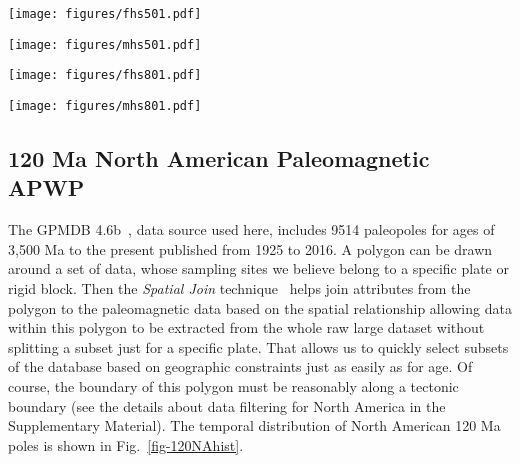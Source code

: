 \begin{figure*}
\centering
\texttt{[image: figures/fhs501.pdf]}
\caption[120 Ma FHM predicted APWP of India]{FHM predicted
120 Ma APWP for India through the
India\textendash{}Somalia\textendash{}Nubia\textendash{}Mantle plate circuit.
Its age step is 5 Myr.}\label{fig-fhsPred501}
\end{figure*}

\begin{figure*}
\centering
\texttt{[image: figures/mhs501.pdf]}
\caption[120 Ma MHM predicted APWP of India]{MHM predicted
120 Ma APWP for India through the
India\textendash{}Somalia\textendash{}Nubia\textendash{}Mantle plate circuit.
Its age step is 5 Myr. The dashed line is the FHM predicted path shown in
Fig.~\ref{fig-fhsPred501}.}\label{fig-mhsPred501}
\end{figure*}

\begin{figure*}
\centering
\texttt{[image: figures/fhs801.pdf]}
\caption[120 Ma FHM predicted APWP of Australia]{FHM predicted
120 Ma APWP for Australia through the Australia\textendash{}East
Antarctica\textendash{}Somalia\textendash{}Nubia\textendash{}Mantle plate
circuit. Its age step is 5 Myr.}\label{fig-fhsPred801}
\end{figure*}

\begin{figure*}
\centering
\texttt{[image: figures/mhs801.pdf]}
\caption[120 Ma MHM predicted APWP of Australia]{MHM predicted
120 Ma APWP for Australia through the Australia\textendash{}East
Antarctica\textendash{}Somalia\textendash{}Nubia\textendash{}Mantle plate
circuit. Its age step is 5 Myr. The dashed line is the FHM predicted path shown
in Fig.~\ref{fig-fhsPred801}.}\label{fig-mhsPred801}
\end{figure*}

\subsection{120 Ma North American Paleomagnetic APWP}

The GPMDB 4.6b~\cite{P05}, data source used here, includes 9514 paleopoles for
ages of 3,500 Ma to the present published from 1925 to 2016. A polygon can be
drawn around a set of data, whose sampling sites we believe belong to a specific
plate or rigid block. Then the {\em Spatial Join\/} technique~\cite{J07} helps
join attributes from the polygon to the paleomagnetic data based on the spatial
relationship allowing data within this polygon to be extracted from the whole
raw large dataset without splitting a subset just for a specific plate. That
allows us to quickly select subsets of the database based on geographic
constraints just as easily as for age. Of course, the boundary of this polygon
must be reasonably along a tectonic boundary (see the details about data
filtering for North America in the Supplementary Material). The temporal
distribution of North American 120 Ma poles is shown in
Fig.~\ref{fig-120NAhist}.

